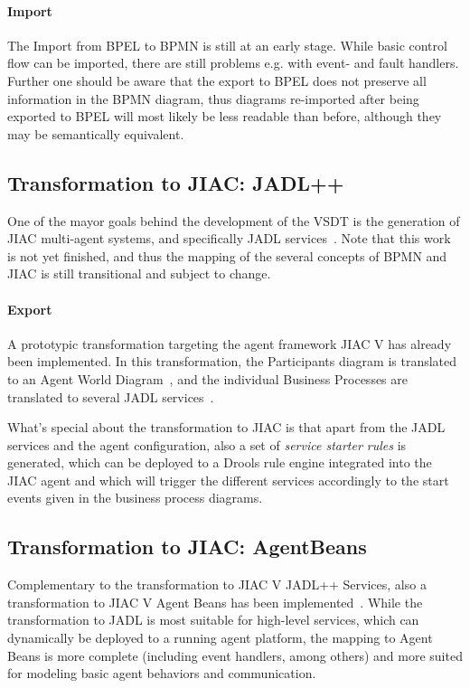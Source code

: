 \paragraph{Import}
The Import from BPEL to BPMN is still at an early stage.  While basic control
flow can be imported, there are still problems e.g. with event- and fault handlers.
Further one should be aware that the export to BPEL does not preserve all
information in the BPMN diagram, thus diagrams re-imported after being exported
to BPEL will most likely be less readable than before, although they may be
semantically equivalent.


\subsection{Transformation to JIAC: JADL++}
\label{sec:user_trafo_jadl}

One of the mayor goals behind the development of the VSDT is the generation of
JIAC multi-agent systems, and specifically JADL services~\cite{kuester2012integrating}.
Note that this work is not yet finished, and thus the mapping of the several
concepts of BPMN and JIAC is still transitional and subject to change.

\paragraph{Export}
A prototypic transformation targeting the agent framework JIAC V has already been
implemented.  In this transformation, the Participants diagram is translated to
an Agent World Diagram~\cite{lutzenberger2009unifying}, and the individual Business
Processes are translated to several JADL services~\cite{hirsch2010programming}.

What's special about the transformation to JIAC is that apart from the JADL
services and the agent configuration, also a set of \emph{service starter rules}
is generated, which can be deployed to a Drools rule engine integrated into the
JIAC agent and which will trigger the different services accordingly to the start
events given in the business process diagrams.


\subsection{Transformation to JIAC: AgentBeans}
\label{sec:user_trafo_agentbeans}

Complementary to the transformation to JIAC V JADL++ Services, also a transformation
to JIAC V Agent Beans has been implemented~\cite{tan2011dipl}.  While the
transformation to JADL is most suitable for high-level services, which can
dynamically be deployed to a running agent platform, the mapping to Agent Beans
is more complete (including event handlers, among others) and more suited for
modeling basic agent behaviors and communication.

